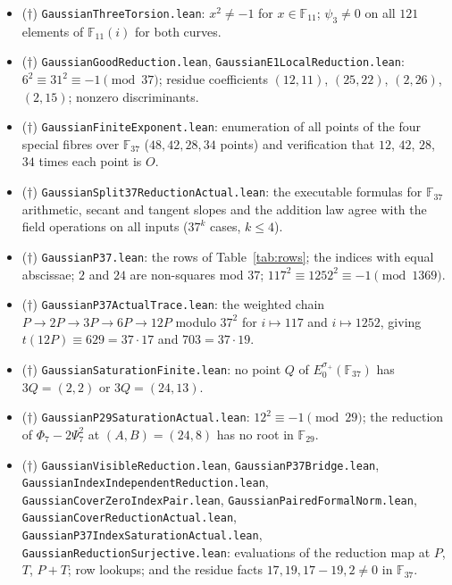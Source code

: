 \documentclass[10pt]{article}
\theoremstyle{definition}
\theoremstyle{remark}
\newcommand{\F}{\mathbb{F}}
\newcommand{\Oinf}{O}
\begin{document}
\begin{itemize}
\item ($\dagger$) \texttt{Gaussian\allowbreak Three\allowbreak Torsion.\allowbreak lean}: $x^2\ne-1$ for
$x\in\F_{11}$; $\psi_3\ne0$ on all $121$ elements of $\F_{11}(i)$ for both curves.
\item ($\dagger$) \texttt{Gaussian\allowbreak Good\allowbreak Reduction.\allowbreak lean}, \texttt{Gaussian\allowbreak E1\allowbreak Local\allowbreak Reduction.\allowbreak lean}:
$6^2\equiv31^2\equiv-1\pmod{37}$; residue coefficients $(12,11)$, $(25,22)$,
$(2,26)$, $(2,15)$; nonzero discriminants.
\item ($\dagger$) \texttt{Gaussian\allowbreak Finite\allowbreak Exponent.\allowbreak lean}: enumeration of all
points of the four special fibres over $\F_{37}$ ($48,42,28,34$ points) and
verification that $12$, $42$, $28$, $34$ times each point is $\Oinf$.
\item ($\dagger$) \texttt{Gaussian\allowbreak Split37\allowbreak Reduction\allowbreak Actual.\allowbreak lean}: the executable
formulas for $\F_{37}$ arithmetic, secant and tangent slopes and the addition
law agree with the field operations on all inputs ($37^k$ cases, $k\le4$).
\item ($\dagger$) \texttt{Gaussian\allowbreak P37.\allowbreak lean}: the rows of Table~\ref{tab:rows};
the indices with equal abscissae; $2$ and $24$ are non-squares mod $37$;
$117^2\equiv1252^2\equiv-1\pmod{1369}$.
\item ($\dagger$) \texttt{Gaussian\allowbreak P37\allowbreak Actual\allowbreak Trace.\allowbreak lean}: the weighted chain
$P\to2P\to3P\to6P\to12P$ modulo $37^2$ for $i\mapsto117$ and $i\mapsto1252$,
giving $t(12P)\equiv629=37\cdot17$ and $703=37\cdot19$.
\item ($\dagger$) \texttt{Gaussian\allowbreak Saturation\allowbreak Finite.\allowbreak lean}: no point $Q$ of
$E_0^{\sigma_+}(\F_{37})$ has $3Q=(2,2)$ or $3Q=(24,13)$.
\item ($\dagger$) \texttt{Gaussian\allowbreak P29\allowbreak Saturation\allowbreak Actual.\allowbreak lean}: $12^2\equiv-1\pmod{29}$;
the reduction of $\Phi_7-2\Psi_7^2$ at $(A,B)=(24,8)$ has no root in $\F_{29}$.
\item ($\dagger$) \texttt{Gaussian\allowbreak Visible\allowbreak Reduction.\allowbreak lean}, \texttt{Gaussian\allowbreak P37\allowbreak Bridge.\allowbreak lean},
\texttt{Gaussian\allowbreak Index\allowbreak Independent\allowbreak Reduction.\allowbreak lean}, \texttt{Gaussian\allowbreak Cover\allowbreak Zero\allowbreak Index\allowbreak Pair.\allowbreak lean},
\texttt{Gaussian\allowbreak Paired\allowbreak Formal\allowbreak Norm.\allowbreak lean}, \texttt{Gaussian\allowbreak Cover\allowbreak Reduction\allowbreak Actual.\allowbreak lean},
\texttt{Gaussian\allowbreak P37\allowbreak Index\allowbreak Saturation\allowbreak Actual.\allowbreak lean}, \texttt{Gaussian\allowbreak Reduction\allowbreak Surjective.\allowbreak lean}:
evaluations of the reduction map at $P$, $T$, $P+T$; row lookups; and the
residue facts $17,19,17-19,2\ne0$ in $\F_{37}$.
\end{itemize}
\end{document}
